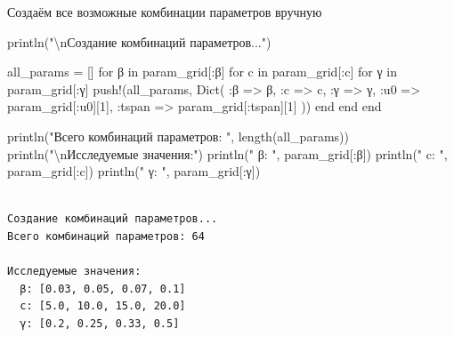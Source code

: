 \documentclass[
  12pt,
  a4paper,
  DIV=11,
  numbers=noendperiod]{scrreprt}
\newenvironment{Shaded}{\begin{snugshade}}{\end{snugshade}}
\newcommand{\ControlFlowTok}[1]{\textcolor[rgb]{0.00,0.23,0.31}{#1}}
\newcommand{\FloatTok}[1]{\textcolor[rgb]{0.68,0.00,0.00}{#1}}
\newcommand{\FunctionTok}[1]{\textcolor[rgb]{0.28,0.35,0.67}{#1}}
\newcommand{\KeywordTok}[1]{\textcolor[rgb]{0.00,0.23,0.31}{#1}}
\newcommand{\NormalTok}[1]{\textcolor[rgb]{0.00,0.23,0.31}{#1}}
\newcommand{\OperatorTok}[1]{\textcolor[rgb]{0.37,0.37,0.37}{#1}}
\newcommand{\SpecialCharTok}[1]{\textcolor[rgb]{0.37,0.37,0.37}{#1}}
\newcommand{\StringTok}[1]{\textcolor[rgb]{0.13,0.47,0.30}{#1}}
\begin{document}
Создаём все возможные комбинации параметров вручную

\begin{Shaded}
\begin{Highlighting}[]
\FunctionTok{println}\NormalTok{(}\StringTok{"}\SpecialCharTok{\textbackslash{}n}\StringTok{Создание комбинаций параметров..."}\NormalTok{)}

\NormalTok{all\_params }\OperatorTok{=}\NormalTok{ []}
\ControlFlowTok{for}\NormalTok{ β }\KeywordTok{in}\NormalTok{ param\_grid[}\OperatorTok{:}\NormalTok{β]}
    \ControlFlowTok{for}\NormalTok{ c }\KeywordTok{in}\NormalTok{ param\_grid[}\OperatorTok{:}\NormalTok{c]}
        \ControlFlowTok{for}\NormalTok{ γ }\KeywordTok{in}\NormalTok{ param\_grid[}\OperatorTok{:}\NormalTok{γ]}
            \FunctionTok{push!}\NormalTok{(all\_params, }\FunctionTok{Dict}\NormalTok{(}
                \OperatorTok{:}\NormalTok{β }\OperatorTok{=\textgreater{}}\NormalTok{ β,}
                \OperatorTok{:}\NormalTok{c }\OperatorTok{=\textgreater{}}\NormalTok{ c,}
                \OperatorTok{:}\NormalTok{γ }\OperatorTok{=\textgreater{}}\NormalTok{ γ,}
                \OperatorTok{:}\NormalTok{u0 }\OperatorTok{=\textgreater{}}\NormalTok{ param\_grid[}\OperatorTok{:}\NormalTok{u0][}\FloatTok{1}\NormalTok{],}
                \OperatorTok{:}\NormalTok{tspan }\OperatorTok{=\textgreater{}}\NormalTok{ param\_grid[}\OperatorTok{:}\NormalTok{tspan][}\FloatTok{1}\NormalTok{]}
\NormalTok{            ))}
        \ControlFlowTok{end}
    \ControlFlowTok{end}
\ControlFlowTok{end}

\FunctionTok{println}\NormalTok{(}\StringTok{"Всего комбинаций параметров: "}\NormalTok{, }\FunctionTok{length}\NormalTok{(all\_params))}
\FunctionTok{println}\NormalTok{(}\StringTok{"}\SpecialCharTok{\textbackslash{}n}\StringTok{Исследуемые значения:"}\NormalTok{)}
\FunctionTok{println}\NormalTok{(}\StringTok{"  β: "}\NormalTok{, param\_grid[}\OperatorTok{:}\NormalTok{β])}
\FunctionTok{println}\NormalTok{(}\StringTok{"  c: "}\NormalTok{, param\_grid[}\OperatorTok{:}\NormalTok{c])}
\FunctionTok{println}\NormalTok{(}\StringTok{"  γ: "}\NormalTok{, param\_grid[}\OperatorTok{:}\NormalTok{γ])}
\end{Highlighting}
\end{Shaded}

\begin{verbatim}

Создание комбинаций параметров...
Всего комбинаций параметров: 64

Исследуемые значения:
  β: [0.03, 0.05, 0.07, 0.1]
  c: [5.0, 10.0, 15.0, 20.0]
  γ: [0.2, 0.25, 0.33, 0.5]
\end{verbatim}
\end{document}

